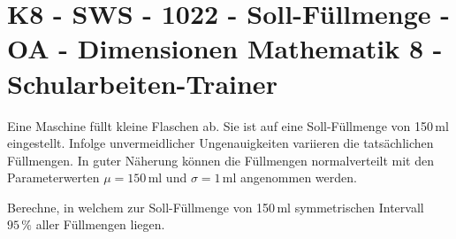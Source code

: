 \section{K8 - SWS - 1022 - Soll-Füllmenge - OA - Dimensionen Mathematik 8 - Schularbeiten-Trainer}

\begin{beispiel}[K8 - SWS]{1}
Eine Maschine füllt kleine Flaschen ab. Sie ist auf eine Soll-Füllmenge von 150\,ml eingestellt. Infolge unvermeidlicher Ungenauigkeiten variieren die tatsächlichen Füllmengen. In guter Näherung können die Füllmengen normalverteilt mit den Parameterwerten $\mu=150$\,ml und $\sigma=1$\,ml angenommen werden.

Berechne, in welchem zur Soll-Füllmenge von 150\,ml symmetrischen Intervall $95\,\%$ aller Füllmengen liegen.

\end{beispiel}